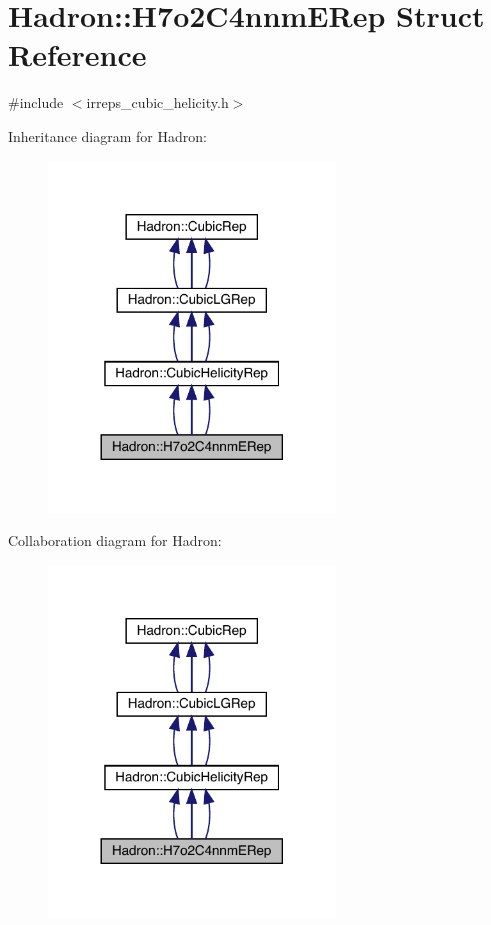 \hypertarget{structHadron_1_1H7o2C4nnmERep}{}\section{Hadron\+:\+:H7o2\+C4nnm\+E\+Rep Struct Reference}
\label{structHadron_1_1H7o2C4nnmERep}


{\ttfamily \#include $<$irreps\+\_\+cubic\+\_\+helicity.\+h$>$}



Inheritance diagram for Hadron\+:
\nopagebreak
\begin{figure}[H]
\begin{center}
\leavevmode
\includegraphics[width=216pt]{dd/d6a/structHadron_1_1H7o2C4nnmERep__inherit__graph}
\end{center}
\end{figure}


Collaboration diagram for Hadron\+:
\nopagebreak
\begin{figure}[H]
\begin{center}
\leavevmode
\includegraphics[width=216pt]{df/d87/structHadron_1_1H7o2C4nnmERep__coll__graph}
\end{center}
\end{figure}
